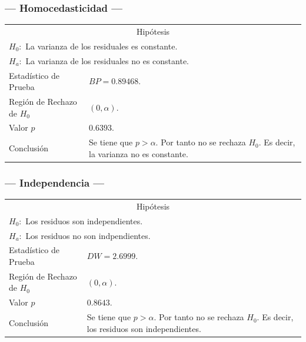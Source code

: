 \subsubsection{--- Homocedasticidad ---} %
\begin{center}
  \begin{tabular}{|l|p{8cm}|}
    \cline{1-2}
    \multicolumn{2}{|c|}{Hipótesis}\\ \cline{1-2}
    \multicolumn{2}{|l|}{\(H_0:\) La varianza de los residuales es constante.} \\ 
    \multicolumn{2}{|l|}{\(H_a:\) La varianza de los residuales no es constante.} \\ \cline{1-2}
    Estadístico de Prueba & \(BP = 0.89468\).\\ \cline{1-2} 
		Región de Rechazo de \(H_0\) & \((0, \alpha )\).\\ \cline{1-2} 
    Valor \(p\) & \(0.6393\).\\ \cline{1-2} 
    Conclusión & Se tiene que \(p> \alpha\). \newline 
		Por tanto no se rechaza \(H_0\). \newline 
		Es decir, la varianza no es constante. \\ \cline{1-2} 
  \end{tabular}
\end{center}

\subsubsection{--- Independencia ---} %
\begin{center}
  \begin{tabular}{|l|p{8cm}|}
    \cline{1-2}
    \multicolumn{2}{|c|}{Hipótesis}\\ \cline{1-2}
    \multicolumn{2}{|l|}{\(H_0:\) Los residuos son independientes.} \\ 
    \multicolumn{2}{|l|}{\(H_a:\) Los residuos no son indpendientes.} \\ \cline{1-2}
    Estadístico de Prueba & \(DW = 2.6999\).\\ \cline{1-2} 
		Región de Rechazo de \(H_0\) & \((0, \alpha )\).\\ \cline{1-2} 
    Valor \(p\) & \(0.8643\).\\ \cline{1-2} 
    Conclusión & Se tiene que \(p> \alpha\). \newline 
		Por tanto no se rechaza \(H_0\). \newline 
		Es decir, los residuos son independientes.\\ \cline{1-2} 
  \end{tabular}
\end{center}

